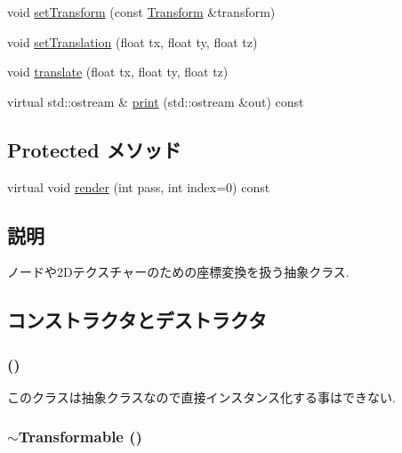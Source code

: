 \begin{CompactItemize}
\item 
void \hyperlink{classm3g_1_1Transformable_05052269aaf19775f3ff1a10d042777e}{setTransform} (const \hyperlink{classm3g_1_1Transform}{Transform} \&transform)
\item 
void \hyperlink{classm3g_1_1Transformable_afd728a7db85b8e12bdafc2b3c08a515}{setTranslation} (float tx, float ty, float tz)
\item 
void \hyperlink{classm3g_1_1Transformable_66d493b8307a85e615c4eb89116f2e09}{translate} (float tx, float ty, float tz)
\item 
virtual std::ostream \& \hyperlink{classm3g_1_1Transformable_6fea17fa1532df3794f8cb39cb4f911f}{print} (std::ostream \&out) const 
\end{CompactItemize}
\subsection*{Protected メソッド}
\begin{CompactItemize}
\item 
virtual void \hyperlink{classm3g_1_1Transformable_1efcb1973989d9963d5bd6d03065d389}{render} (int pass, int index=0) const 
\end{CompactItemize}


\subsection{説明}
ノードや2Dテクスチャーのための座標変換を扱う抽象クラス. 

\subsection{コンストラクタとデストラクタ}
\hypertarget{classm3g_1_1Transformable_ca6563203e3e883391c9d0927028aa04}{
\subsubsection[{Transformable}]{ ()}}
\label{classm3g_1_1Transformable_ca6563203e3e883391c9d0927028aa04}


このクラスは抽象クラスなので直接インスタンス化する事はできない. \hypertarget{classm3g_1_1Transformable_89d9c7912ed11a30a312fd8f72b9ab22}{
\subsubsection[{$\sim$Transformable}]{\setlength{\rightskip}{0pt plus 5cm}$\sim${\bf Transformable} ()}}
\label{classm3g_1_1Transformable_89d9c7912ed11a30a312fd8f72b9ab22}


